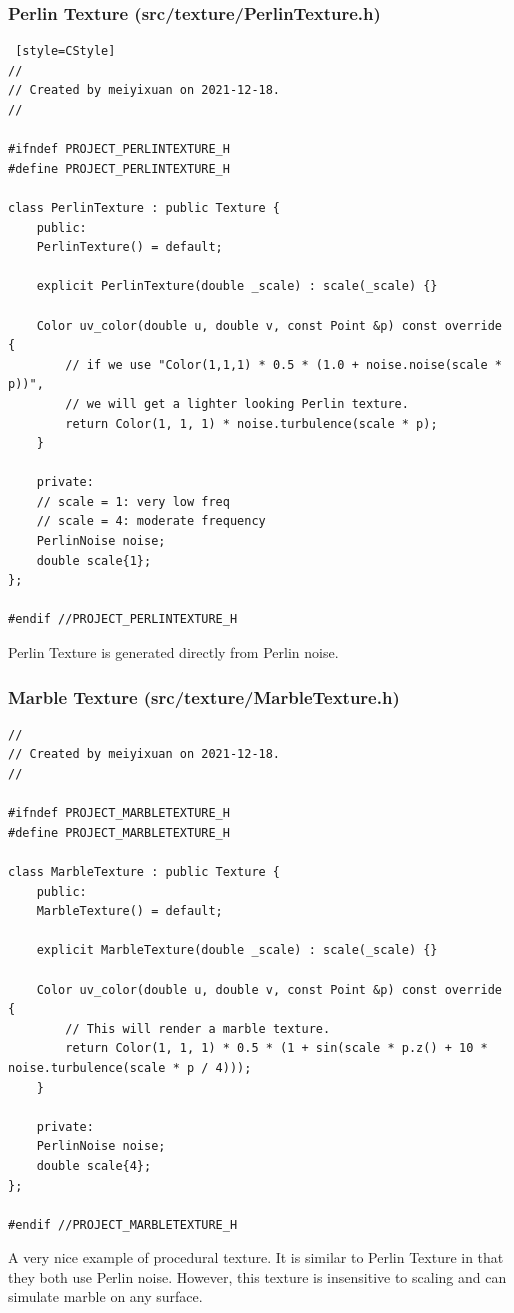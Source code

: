 \documentclass[utf8]{article}
\begin{document}
\subsubsection{Perlin Texture (src/texture/PerlinTexture.h)}
\begin{lstlisting} [style=CStyle]
//
// Created by meiyixuan on 2021-12-18.
//

#ifndef PROJECT_PERLINTEXTURE_H
#define PROJECT_PERLINTEXTURE_H

class PerlinTexture : public Texture {
	public:
	PerlinTexture() = default;
	
	explicit PerlinTexture(double _scale) : scale(_scale) {}
	
	Color uv_color(double u, double v, const Point &p) const override {
		// if we use "Color(1,1,1) * 0.5 * (1.0 + noise.noise(scale * p))",
		// we will get a lighter looking Perlin texture.
		return Color(1, 1, 1) * noise.turbulence(scale * p);
	}
	
	private:
	// scale = 1: very low freq
	// scale = 4: moderate frequency
	PerlinNoise noise;
	double scale{1};
};

#endif //PROJECT_PERLINTEXTURE_H

\end{lstlisting}
Perlin Texture is generated directly from Perlin noise.

\subsubsection{Marble Texture (src/texture/MarbleTexture.h)}
\begin{lstlisting}[style=CStyle]
//
// Created by meiyixuan on 2021-12-18.
//

#ifndef PROJECT_MARBLETEXTURE_H
#define PROJECT_MARBLETEXTURE_H

class MarbleTexture : public Texture {
	public:
	MarbleTexture() = default;
	
	explicit MarbleTexture(double _scale) : scale(_scale) {}
	
	Color uv_color(double u, double v, const Point &p) const override {
		// This will render a marble texture.
		return Color(1, 1, 1) * 0.5 * (1 + sin(scale * p.z() + 10 * noise.turbulence(scale * p / 4)));
	}
	
	private:
	PerlinNoise noise;
	double scale{4};
};

#endif //PROJECT_MARBLETEXTURE_H

\end{lstlisting}
A very nice example of procedural texture. It is similar to Perlin Texture in that they both use Perlin noise. However, this texture is insensitive to scaling and can simulate marble on any surface.
\end{document}
